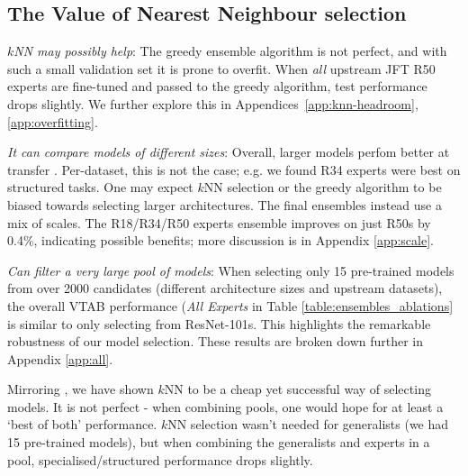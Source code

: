 \documentclass{article} \usepackage{iclr2021_conference,times}
\begin{document}
\subsection{The Value of Nearest Neighbour selection}
\textit{$k$NN may possibly help}:
The greedy ensemble algorithm is not perfect, and with such a small validation set it is prone to overfit.
When \emph{all} upstream JFT R50 experts are fine-tuned and passed to the greedy algorithm, test performance drops slightly. We further explore this in Appendices~\ref{app:knn-headroom}, \ref{app:overfitting}.

\textit{It can compare models of different sizes}: Overall, larger models perfom better at transfer \citep{alex2019big}. Per-dataset, this is not the case; e.g. we found R34 experts were best on structured tasks. One may expect $k$NN selection or the greedy algorithm to be biased towards selecting larger architectures. The final ensembles instead use a mix of scales. The R18/R34/R50 experts ensemble improves on just R50s by 0.4\%, indicating possible benefits; more discussion is in Appendix \ref{app:scale}.

\textit{Can filter a very large pool of models}: When selecting only 15 pre-trained models from over 2000 candidates 
(different architecture sizes and upstream datasets), the overall VTAB performance 
(\emph{All Experts} in Table \ref{table:ensembles_ablations} is similar to only selecting from ResNet-101s.
This highlights the remarkable robustness of our model selection.
These results are broken down further in Appendix \ref{app:all}.

Mirroring \citet{puigcerver2020experts}, we have shown $k$NN to be a cheap yet successful way of selecting models. It is not perfect - when combining pools, one would hope for at least a `best of both' performance. $k$NN selection wasn't needed for generalists (we had 15 pre-trained models), but when combining the generalists and experts in a pool, specialised/structured performance drops slightly.
\end{document}
